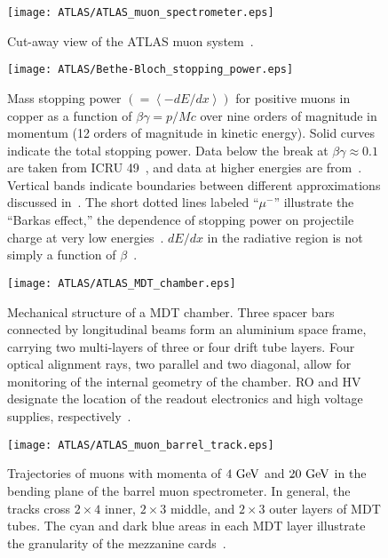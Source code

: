 \begin{figure}[htbp]
 \centering
 \texttt{[image: ATLAS/ATLAS\_muon\_spectrometer.eps]}
 \caption[Cut-away view of the ATLAS muon system.]{%
  Cut-away view of the ATLAS muon system~\cite{PERF-2007-01}.}\label{fig:ATLAS_muon_spectrometer}
\end{figure}

\begin{figure}[htbp]
 \centering
 \texttt{[image: ATLAS/Bethe-Bloch\_stopping\_power.eps]}
 \caption[Mass stopping power for positive muons in copper as a function of $\beta \gamma = p/Mc$.]{%
  Mass stopping power $\left(= \left<-dE/dx\right>\right)$ for positive muons in copper as a function of $\beta \gamma = p/Mc$ over nine orders of magnitude in momentum (12 orders of magnitude in kinetic energy).
  Solid curves indicate the total stopping power.
  Data below the break at $\beta \gamma \approx 0.1$ are taken from ICRU 49~\cite{ICRU49}, and data at higher energies are from~\cite{Groom:2001kq}.
  Vertical bands indicate boundaries between different approximations discussed in~\cite{PDG2018:Ch33}.
  The short dotted lines labeled ``$\mu^{-}$'' illustrate the ``Barkas effect,'' the dependence of stopping power on projectile charge at very low energies~\cite{PhysRev.101.778}.
  $dE/dx$ in the radiative region is not simply a function of $\beta$~\cite{PDG2018:Ch33}.}\label{fig:Bethe-Bloch_stopping_power}
\end{figure}

\begin{figure}[htbp]
 \centering
 \texttt{[image: ATLAS/ATLAS\_MDT\_chamber.eps]}
 \caption[Mechanical structure of a \acrlong{MDT} chamber.]{%
  Mechanical structure of a \gls{MDT} chamber.
  Three spacer bars connected by longitudinal beams form an aluminium space frame, carrying two multi-layers of three or four drift tube layers.
  Four optical alignment rays, two parallel and two diagonal, allow for monitoring of the internal geometry of the chamber.
  RO and HV designate the location of the readout electronics and high voltage supplies, respectively~\cite{PERF-2007-01}.}\label{fig:ATLAS_MDT_chamber}
\end{figure}

\begin{figure}[htbp]
 \centering
 \texttt{[image: ATLAS/ATLAS\_muon\_barrel\_track.eps]}
 \caption[Trajectories of muons through the three layers of \acrlong{MDT} of the barrel muon spectrometer.]{%
  Trajectories of muons with momenta of $4~\mathrm{GeV}$ and $20~\mathrm{GeV}$ in the bending plane of the barrel muon spectrometer.
  In general, the tracks cross $2 \times 4$ inner, $2 \times 3$ middle, and $2 \times 3$ outer layers of \gls{MDT} tubes.
  The cyan and dark blue areas in each MDT layer illustrate the granularity of the mezzanine cards~\cite{PERF-2007-01}.}\label{fig:ATLAS_muon_barrel_track}
\end{figure}

